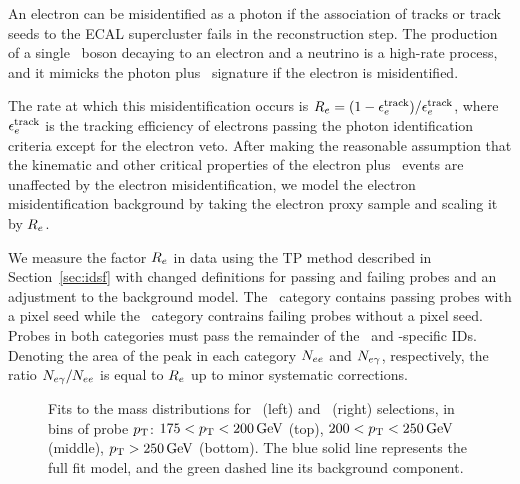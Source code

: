 An electron can be misidentified as a photon if the association of tracks or track seeds to the ECAL supercluster fails in the reconstruction step. 
The production of a single \PW\ boson decaying to an electron and a neutrino is a high-rate process, and it mimicks the photon plus \met\ signature if the electron is misidentified.

The rate  at which this misidentification occurs is $R_{{e}} = (1 - \epsilon_{{e}}^{\text{track}}) / \epsilon_{{e}}^{\text{track}}$, where $\epsilon_{{e}}^{\text{track}}$ is the tracking efficiency of electrons passing the photon identification criteria except for the electron veto.
After making the reasonable assumption that the kinematic and other critical properties of the electron plus \met\ events are unaffected by the electron misidentification, we model the electron misidentification background by taking the electron proxy sample and scaling it by $R_{{e}}$.


We measure the factor $R_{{e}}$ in data using the TP method described in Section~\ref{sec:idsf} with changed definitions for passing and failing probes and an adjustment to the background model.
The \Pe\Pe\ category contains passing probes with a pixel seed while the \Pe\Pgg\ category contrains failing probes without a pixel seed.
Probes in both categories must pass the remainder of the \egamma\ and \Pgg-specific IDs.
Denoting the area of the peak in each category  $N_{{e}{e}}$ and $N_{{e}\gamma}$, respectively, the ratio $N_{{e}\gamma} / N_{{e}{e}}$ is equal to $R_{{e}}$ up to minor systematic corrections.

\begin{figure}[htbp]
  \centering
  \caption{
      Fits to the mass distributions for \Pe\Pe\ (left) and \Pe\Pgg\ (right) selections, in bins of probe $p_{\mathrm{T}}$: $175 < p_{\mathrm{T}} < 200\,\text{Ge\hspace{-.08em}V}$ (top), $200 < p_{\mathrm{T}} < 250\,\text{Ge\hspace{-.08em}V}$ (middle), $p_{\mathrm{T}} > 250\,\text{Ge\hspace{-.08em}V}$ (bottom). 
      The blue solid line represents the full fit model, and the green dashed line its background component.
    }
    \label{fig:efake_fits}
\end{figure}

